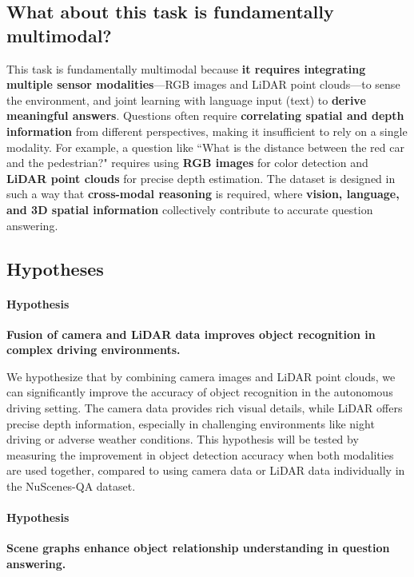 \documentclass{article} %
\begin{document}
	\subsection{  What about this task is fundamentally multimodal?}
	This task is fundamentally multimodal because \textbf{it requires integrating multiple sensor modalities}—RGB images and LiDAR point clouds—to sense the environment, and joint learning with language input (text) to \textbf{derive meaningful answers}. Questions often require \textbf{correlating spatial and depth information} from different perspectives, making it insufficient to rely on a single modality. For example, a question like ``What is the distance between the red car and the pedestrian?" requires using \textbf{RGB images} for color detection and \textbf{LiDAR point clouds} for precise depth estimation. The dataset is designed in such a way that \textbf{cross-modal reasoning} is required, where \textbf{vision, language, and 3D spatial information} collectively contribute to accurate question answering.
	
	\subsection{Hypotheses}
	
	\paragraph{ Hypothesis}
	
	\textbf{Fusion of camera and LiDAR data improves object recognition in complex driving environments.}
	
	We hypothesize that by combining camera images and LiDAR point clouds, we can significantly improve the accuracy of object recognition in the autonomous driving setting. The camera data provides rich visual details, while LiDAR offers precise depth information, especially in challenging environments like night driving or adverse weather conditions. This hypothesis will be tested by measuring the improvement in object detection accuracy when both modalities are used together, compared to using camera data or LiDAR data individually in the NuScenes-QA dataset.
	
	
	\paragraph{ Hypothesis}
	\textbf{Scene graphs enhance object relationship understanding in question answering.}
	
\end{document}
